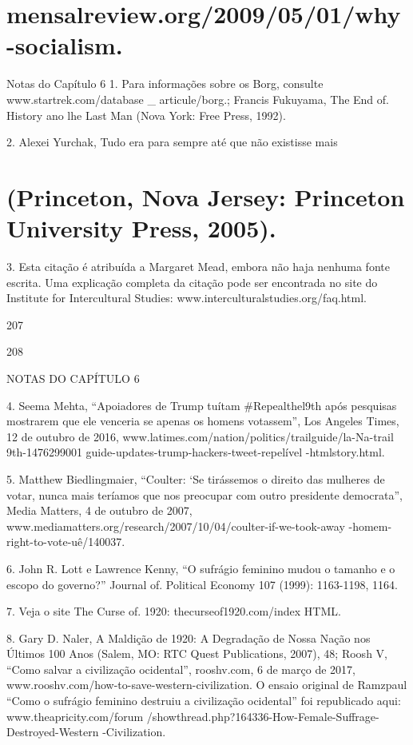 \section{mensalreview.org/2009/05/01/why-socialism.}
 \par 
Notas do Capítulo {\color{blue}6} 1. Para informações sobre os Borg, consulte www.startrek.com/database _ articule/borg.; Francis Fukuyama, The End of. History ano lhe Last Man (Nova York: Free Press, 1992).
 \par 
2. Alexei Yurchak, Tudo era para sempre até que não existisse mais
 \par 
\section{(Princeton, Nova Jersey: Princeton University Press, 2005).}
 \par 
3. Esta citação é atribuída a Margaret Mead, embora não haja nenhuma fonte escrita. Uma explicação completa da citação pode ser encontrada no site do Institute for Intercultural Studies: www.interculturalstudies.org/faq.html.
 \par 
207
 \par 
208
 \par 
NOTAS DO CAPÍTULO {\color{blue}6}
 \par 
4. Seema Mehta, “Apoiadores de Trump tuítam #Repealthel9th após pesquisas mostrarem que ele venceria se apenas os homens votassem”, Los Angeles Times, {\color{blue}12} de outubro de 2016, www.latimes.com/nation/politics/trailguide/la-Na-trail 9th-1476299001 guide-updates-trump-hackers-tweet-repelível -htmlstory.html.
 \par 
5. Matthew Biedlingmaier, “Coulter: ‘Se tirássemos o direito das mulheres de votar, nunca mais teríamos que nos preocupar com outro presidente democrata”, Media Matters, {\color{blue}4} de outubro de 2007, www.mediamatters.org/research/2007/10/04/coulter-if-we-took-away -homem-right-to-vote-uê/140037.
 \par 
6. John R. Lott e Lawrence Kenny, “O sufrágio feminino mudou o tamanho e o escopo do governo?” Journal of. Political Economy {\color{blue}107} (1999): 1163-1198, 1164.
 \par 
7. Veja o site The Curse of. 1920: thecurseof1920.com/index HTML.
 \par 
8. Gary D. Naler, A Maldição de 1920: A Degradação de Nossa Nação nos Últimos {\color{blue}100} Anos (Salem, MO: RTC Quest Publications, 2007), 48; Roosh V, “Como salvar a civilização ocidental”, rooshv.com, {\color{blue}6} de março de 2017, www.rooshv.com/how-to-save-western-civilization. O ensaio original de Ramzpaul “Como o sufrágio feminino destruiu a civilização ocidental” foi republicado aqui: www.theapricity.com/forum /showthread.php?164336-How-Female-Suffrage-Destroyed-Western -Civilization.
